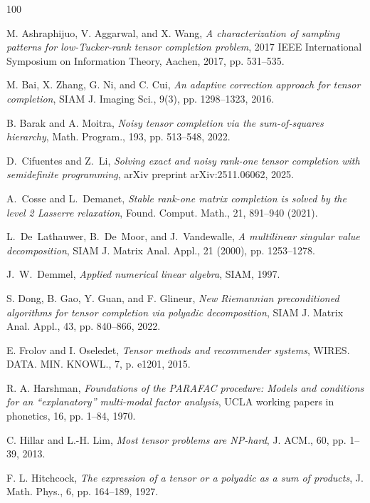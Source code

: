 \documentclass{amsart}
\theoremstyle{definition}
\numberwithin{equation}{section}
\begin{document}
\begin{thebibliography}{100}

{\sc M. Ashraphijuo, V. Aggarwal, and X. Wang}, 
{\em A characterization of sampling patterns for low-Tucker-rank tensor completion problem}, 
2017 IEEE International Symposium on Information Theory, Aachen, 2017, pp. 531--535.

{\sc M. Bai, X. Zhang, G. Ni, and C. Cui}, 
{\em An adaptive correction approach for tensor completion}, 
SIAM J. Imaging Sci., 
9(3), pp. 1298--1323, 2016.

{\sc B. Barak and A. Moitra}, 
{\em Noisy tensor completion via the sum-of-squares hierarchy}, 
Math. Program., 
193, pp. 513--548, 2022.

{\sc D.~Cifuentes and Z.~Li},
{\em Solving exact and noisy rank-one tensor completion with semidefinite programming},
arXiv preprint arXiv:2511.06062, 2025.

{\sc A.~Cosse and L.~Demanet},
{\em Stable rank-one matrix completion is solved by the level 2 Lasserre relaxation},
Found. Comput. Math., 
21, 891--940 (2021). 

{\sc L.~De~Lathauwer, B.~De~Moor, and J.~Vandewalle},
{\em A multilinear singular value decomposition},
SIAM J. Matrix Anal. Appl., 
21 (2000), pp. 1253--1278.

{\sc J.~W.~Demmel},
{\em Applied numerical linear algebra},
SIAM, 1997.

{\sc S. Dong, B. Gao, Y. Guan, and F. Glineur}, 
{\em New Riemannian preconditioned algorithms for tensor completion via polyadic decomposition}, 
SIAM J. Matrix Anal. Appl., 
43, pp. 840--866, 2022.

{\sc E. Frolov and I. Oseledet}, 
{\em Tensor methods and recommender systems}, 
WIRES. DATA. MIN. KNOWL., 
7, p. e1201, 2015.

{\sc  R. A. Harshman},
{\em Foundations of the PARAFAC procedure: Models and conditions for an “explanatory” multi-modal factor analysis}, 
UCLA working papers in phonetics, 16, pp. 1--84, 1970.

{\sc C. Hillar and L.-H. Lim}, 
{\em Most tensor problems are NP-hard}, 
J. ACM., 
60, pp. 1--39, 2013.

{\sc F. L. Hitchcock}, 
{\em The expression of a tensor or a polyadic as a sum of products}, 
J. Math. Phys., 
6, pp. 164--189, 1927.


\end{thebibliography}
\end{document}
